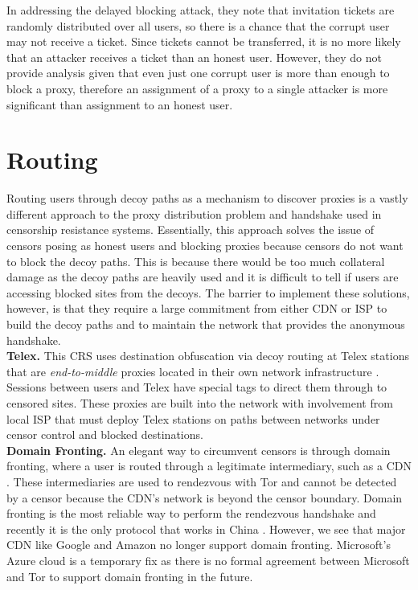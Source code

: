 In addressing the delayed blocking attack, they note that invitation tickets are randomly distributed over all users, so there is a chance that the corrupt user may not receive a ticket. Since tickets cannot be transferred, it is no more likely that an attacker receives a ticket than an honest user. However, they do not provide analysis given that even just one corrupt user is more than enough to block a proxy, therefore an assignment of a proxy to a single attacker is more significant than assignment to an honest user. \\


\section{Routing}

Routing users through decoy paths as a mechanism to discover proxies is a vastly different approach to the proxy distribution problem and handshake used in censorship resistance systems. Essentially, this approach solves the issue of censors posing as honest users and blocking proxies because censors do not want to block the decoy paths. This is because there would be too much collateral damage as the decoy paths are heavily used and it is difficult to tell if users are accessing blocked sites from the decoys. The barrier to implement these solutions, however, is that they require a large commitment from either \ac{CDN} or \ac{ISP} to build the decoy paths and to maintain the network that provides the anonymous handshake.\\

\textbf{Telex.} This \ac{CRS} uses destination obfuscation via decoy routing at Telex stations that are \textit{end-to-middle} proxies located in their own network infrastructure \cite{wustrow2011telex}. Sessions between users and Telex have special tags to direct them through to censored sites. These proxies are built into the network with involvement from local \ac{ISP} that must deploy Telex stations on paths between networks under censor control and blocked destinations.\\

\textbf{Domain Fronting.} An elegant way to circumvent censors is through domain fronting, where a user is routed through a legitimate intermediary, such as a \ac{CDN} \cite{Fifield2017a}. These intermediaries are used to rendezvous with Tor and cannot be detected by a censor because the \ac{CDN}'s network is beyond the censor boundary. Domain fronting is the most reliable way to perform the rendezvous handshake and recently it is the only protocol that works in China \cite{TORDOMAIN:2019}. However, we see that major \ac{CDN} like Google and Amazon no longer support domain fronting. Microsoft's Azure cloud is a temporary fix as there is no formal agreement between Microsoft and Tor to support domain fronting in the future.\\

